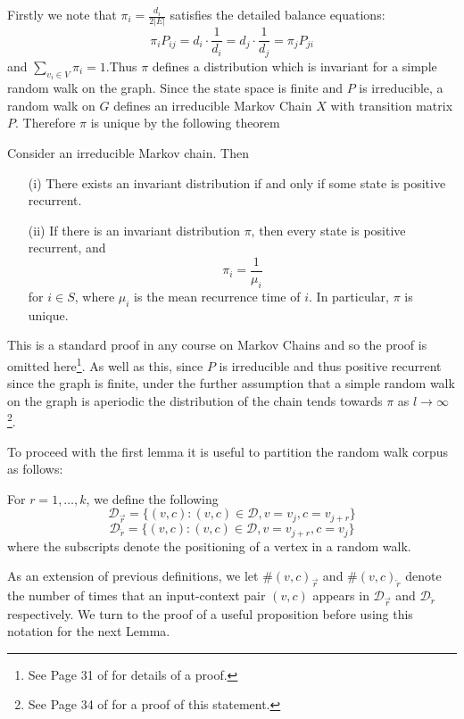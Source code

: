 \documentclass[a4paper]{article}
\newcommand{\D}{\mathcal D}
\newcommand{\rar}{\overrightarrow r}
\newcommand{\lar}{\overleftarrow r}
\begin{document}
Firstly we note that $\pi_i = \frac{d_i}{2|E|}$ satisfies the detailed balance equations:
\[\pi_i P_{ij} = d_i\cdot \frac{1}{d_i} = d_j \cdot \frac{1}{d_j} = \pi_j P_{ji}\]
and $\sum_{v_i \in V} \pi_i = 1$.Thus $\pi$ defines a distribution which is
invariant for a simple random walk on the graph. Since the state space is
finite and $P$ is irreducible, a random walk on $G$ defines an
irreducible Markov Chain $X$ with transition matrix $P$. Therefore $\pi$ is
unique by the following theorem
\begin{theorem}
  Consider an irreducible Markov chain. Then
  \begin{itemize}
  \item[(i)] There exists an invariant distribution if and only if some state is
    positive recurrent.
  \item[(ii)] If there is an invariant distribution $\pi$, then every state is
    positive recurrent, and
    \[\pi_i = \frac{1}{\mu_i}\]
    for $i \in S$, where $\mu_i$ is the mean recurrence time of $i$. In
    particular, $\pi$ is unique.
  \end{itemize}
\end{theorem}
This is a standard proof in any course on Markov Chains and so the proof is
omitted here\footnote{See Page 31 of \cite{markov_chains} for details of a proof.}. As
well as this, since $P$ is irreducible and thus positive recurrent since the
graph is finite, under the further assumption that a simple random walk on the
graph is aperiodic the distribution of the chain tends towards $\pi$ as
$l \to \infty$\footnote{See Page 34 of \cite{markov_chains} for a proof of this statement.}.

To proceed with the first lemma it is useful to partition the random walk corpus as follows:
\begin{definition}
  For $r = 1, \dots, k$, we define the following
  \[\D_{\rar} = \{ (v, c) : (v, c) \in \D, v = v_j, c = v_{j+r}\}\]
  \[\D_{\lar} = \{ (v, c) : (v, c) \in \D, v = v_{j+r}, c = v_{j}\}\]
  where the subscripts denote the positioning of a vertex in a random walk.
\end{definition}
As an extension of previous definitions, we let $\#(v, c)_{\rar}$ and $\#(v,
c)_{\lar}$ denote the number of times that an input-context pair $(v,c)$ appears
in $\D_{\rar}$ and $\D_{\lar}$ respectively. We turn to the proof of a useful proposition before using this
notation for the next Lemma.
\end{document}
